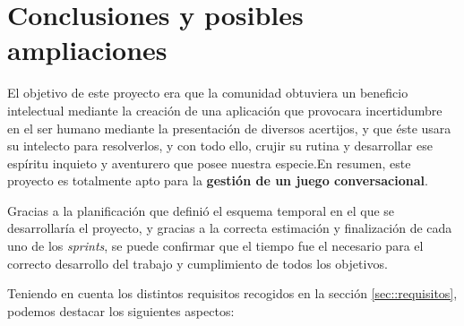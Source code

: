 \chapter{Conclusiones y posibles ampliaciones}

El objetivo de este proyecto era que la comunidad obtuviera un beneficio intelectual mediante la creación de una aplicación que provocara incertidumbre en el ser humano mediante la presentación de diversos acertijos, y que éste usara su intelecto para resolverlos, y con todo ello, crujir su rutina y desarrollar ese espíritu inquieto y aventurero que posee nuestra especie.En resumen, este proyecto es totalmente apto para la \textbf{gestión de un juego conversacional}. 

Gracias a la planificación que definió el esquema temporal en el que se desarrollaría el proyecto, y gracias a la correcta estimación y  finalización de cada uno de los \textit{sprints}, se puede confirmar que el tiempo fue el necesario para el correcto desarrollo del trabajo y cumplimiento de todos los objetivos.

Teniendo en cuenta los distintos requisitos recogidos en la sección \ref{sec::requisitos}, podemos destacar los siguientes aspectos:

